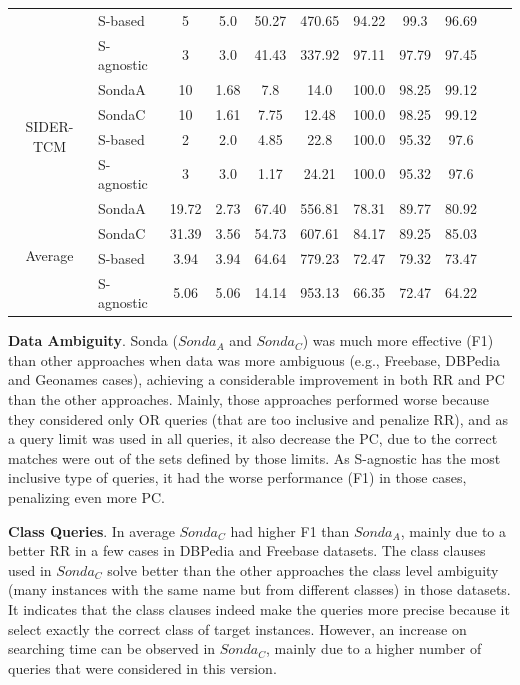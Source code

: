 \begin{center}
\begin{table}[h]
\begin{tabular}{|c|l|c|c|c|c|c|c|c|c|c|}
 & S-based  & 5 & 5.0   & 50.27  & 470.65 & 94.22 & 99.3 & 96.69  \\
 & S-agnostic  & 3 & 3.0   & 41.43  & 337.92 & 97.11 & 97.79 & 97.45  \\ \hline
\multirow{4}{*}{SIDER-TCM}  & SondaA  & 10 & 1.68   & 7.8  & 14.0 & 100.0 & 98.25 & 99.12  \\
 & SondaC  & 10 & 1.61   & 7.75  & 12.48 & 100.0 & 98.25 & 99.12  \\
 & S-based  & 2 & 2.0   & 4.85  & 22.8 & 100.0 & 95.32 & 97.6  \\
 & S-agnostic  & 3 & 3.0   & 1.17  & 24.21 & 100.0 & 95.32 & 97.6  \\ \hline	
 \multirow{4}{*}{Average}  & SondaA  &  19.72	& 2.73 & 	67.40 & 	556.81 & 	78.31 & 	89.77 & 	80.92\\
 & SondaC  & 31.39	& 3.56 &	54.73 & 	607.61	& 84.17	& 89.25 & 	85.03 \\
 & S-based  & 3.94	& 3.94	& 	64.64	& 	779.23	& 	72.47	& 	79.32	& 	73.47\\
  & S-agnostic  & 5.06 &  	5.06	 & 14.14 & 	953.13	 & 66.35	 & 72.47 & 	64.22\\ \hline	
 
\end{tabular}  
\end{table} 
\end{center}

\textbf{Data Ambiguity}. Sonda ($Sonda_A$ and $Sonda_C$) was much more effective (F1) than other approaches when data was more ambiguous  (e.g., Freebase, DBPedia and Geonames cases), achieving a considerable improvement in both RR and PC than the other approaches. Mainly, those approaches performed worse because they considered only OR queries (that are too inclusive and penalize RR),  and as a query limit was used in all queries, it also decrease the PC, due to the correct matches were out of the sets defined by those limits. As S-agnostic has the most inclusive type of queries, it had the worse performance (F1) in those cases, penalizing even more PC.

\textbf{Class Queries}. In average $Sonda_C$ had higher F1 than $Sonda_A$, mainly due to a better RR in a few cases in DBPedia and Freebase datasets. The class clauses used in $Sonda_C$ solve better than the other approaches the class level ambiguity (many instances with the same name but from different classes) in those datasets. It indicates that the class clauses indeed make the queries more precise because it select exactly the correct class of target instances. However, an increase on searching time can be observed in $Sonda_C$, mainly due to a higher number of queries that were considered in this version.

